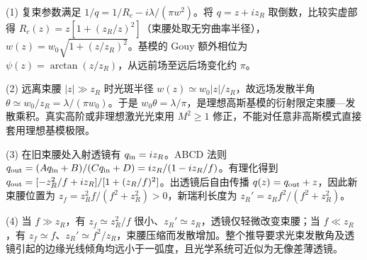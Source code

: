 (1) 复束参数满足 \(1/q=1/R_c-i\lambda/(\pi w^2)\)。将 \(q=z+iz_R\) 取倒数，比较实虚部得 \(R_c(z)=z[1+(z_R/z)^2]\)（束腰处取无穷曲率半径），\(w(z)=w_0\sqrt{1+(z/z_R)^2}\)。基模的 Gouy 额外相位为 \(\psi(z)=\arctan(z/z_R)\)，从远前场至远后场变化约 \(\pi\)。

(2) 远离束腰 \(|z|\gg z_R\) 时光斑半径 \(w(z)\simeq w_0|z|/z_R\)，故远场发散半角 \(\theta\simeq w_0/z_R=\lambda/(\pi w_0)\)。于是 \(w_0\theta=\lambda/\pi\)，是理想高斯基模的衍射限定束腰—发散乘积。真实高阶或非理想激光光束用 \(M^2\ge1\) 修正，不能对任意非高斯模式直接套用理想基模极限。

(3) 在旧束腰处入射透镜有 \(q_{\rm in}=iz_R\)。ABCD 法则 \(q_{\rm out}=(Aq_{\rm in}+B)/(Cq_{\rm in}+D)=iz_R/(1-iz_R/f)\)。有理化得到 \(q_{\rm out}=[-z_R^2/f+iz_R]/[1+(z_R/f)^2]\)。出透镜后自由传播 \(q(z)=q_{\rm out}+z\)，因此新束腰位置为 \(z_f=z_R^2f/(f^2+z_R^2)>0\)，新瑞利长度为 \(z_R'=z_Rf^2/(f^2+z_R^2)\)。

(4) 当 \(f\gg z_R\)，有 \(z_f\simeq z_R^2/f\) 很小、\(z_R'\simeq z_R\)，透镜仅轻微改变束腰；当 \(f\ll z_R\)，有 \(z_f\simeq f\)、\(z_R'\simeq f^2/z_R\)，束腰压缩而发散增加。整个推导要求光束发散角及透镜引起的边缘光线倾角均远小于一弧度，且光学系统可近似为无像差薄透镜。
